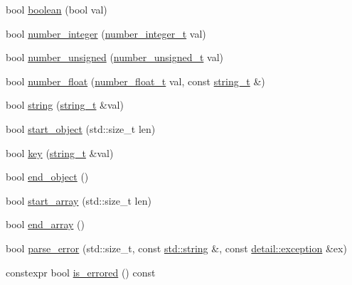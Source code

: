 \begin{DoxyCompactItemize}
\item 
bool \hyperlink{classnlohmann_1_1detail_1_1json__sax__dom__callback__parser_ab7d8db672189164a8c0731e65ada1b45}{boolean} (bool val)
\item 
bool \hyperlink{classnlohmann_1_1detail_1_1json__sax__dom__callback__parser_a68d9eddfd572e8687c1c8107e0505aa6}{number\+\_\+integer} (\hyperlink{classnlohmann_1_1detail_1_1json__sax__dom__callback__parser_a3ba8fc7a8d83c5b0eeb3b543ad844b8d}{number\+\_\+integer\+\_\+t} val)
\item 
bool \hyperlink{classnlohmann_1_1detail_1_1json__sax__dom__callback__parser_acabb231463bf669441c22e4ea385a9fb}{number\+\_\+unsigned} (\hyperlink{classnlohmann_1_1detail_1_1json__sax__dom__callback__parser_a2406c5125f7128fb9c01921df2903001}{number\+\_\+unsigned\+\_\+t} val)
\item 
bool \hyperlink{classnlohmann_1_1detail_1_1json__sax__dom__callback__parser_ae21f7872c334c77d03ae033cb0749b1c}{number\+\_\+float} (\hyperlink{classnlohmann_1_1detail_1_1json__sax__dom__callback__parser_a914ea0555cea5290449fb791ae41c655}{number\+\_\+float\+\_\+t} val, const \hyperlink{classnlohmann_1_1detail_1_1json__sax__dom__callback__parser_a00e7d95d82d5d8a43421526a42a8eabc}{string\+\_\+t} \&)
\item 
bool \hyperlink{classnlohmann_1_1detail_1_1json__sax__dom__callback__parser_ad94e912a67c7b96158937236805b8b47}{string} (\hyperlink{classnlohmann_1_1detail_1_1json__sax__dom__callback__parser_a00e7d95d82d5d8a43421526a42a8eabc}{string\+\_\+t} \&val)
\item 
bool \hyperlink{classnlohmann_1_1detail_1_1json__sax__dom__callback__parser_a040e60243cc7c18a6078c6b83cdb4a81}{start\+\_\+object} (std\+::size\+\_\+t len)
\item 
bool \hyperlink{classnlohmann_1_1detail_1_1json__sax__dom__callback__parser_a0cc4a5192fe9b803276edb831b6099fa}{key} (\hyperlink{classnlohmann_1_1detail_1_1json__sax__dom__callback__parser_a00e7d95d82d5d8a43421526a42a8eabc}{string\+\_\+t} \&val)
\item 
bool \hyperlink{classnlohmann_1_1detail_1_1json__sax__dom__callback__parser_ae75d313d6d1b9c29508e740a10fefa18}{end\+\_\+object} ()
\item 
bool \hyperlink{classnlohmann_1_1detail_1_1json__sax__dom__callback__parser_a5255b98ba8282e3625968f91cff9d3d0}{start\+\_\+array} (std\+::size\+\_\+t len)
\item 
bool \hyperlink{classnlohmann_1_1detail_1_1json__sax__dom__callback__parser_aa64e7a650952174037d32028de582c12}{end\+\_\+array} ()
\item 
bool \hyperlink{classnlohmann_1_1detail_1_1json__sax__dom__callback__parser_aac6e64f0b59c9150cde974e182d5ecab}{parse\+\_\+error} (std\+::size\+\_\+t, const \hyperlink{namespacenlohmann_1_1detail_a1ed8fc6239da25abcaf681d30ace4985ab45cffe084dd3d20d928bee85e7b0f21}{std\+::string} \&, const \hyperlink{classnlohmann_1_1detail_1_1exception}{detail\+::exception} \&ex)
\item 
constexpr bool \hyperlink{classnlohmann_1_1detail_1_1json__sax__dom__callback__parser_a6c130e597672d0ee0888530f94ea7b2d}{is\+\_\+errored} () const 
\end{DoxyCompactItemize}
